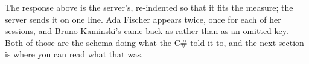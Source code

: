 The response above is the server's, re-indented so that it fits the measure;
the server sends it on one line. Ada Fischer appears twice, once for each of
her sessions, and Bruno Kaminski's  came back as  rather
than as an omitted key. Both of those are the schema doing what the C\# told it
to, and the next section is where you can read what that was.
